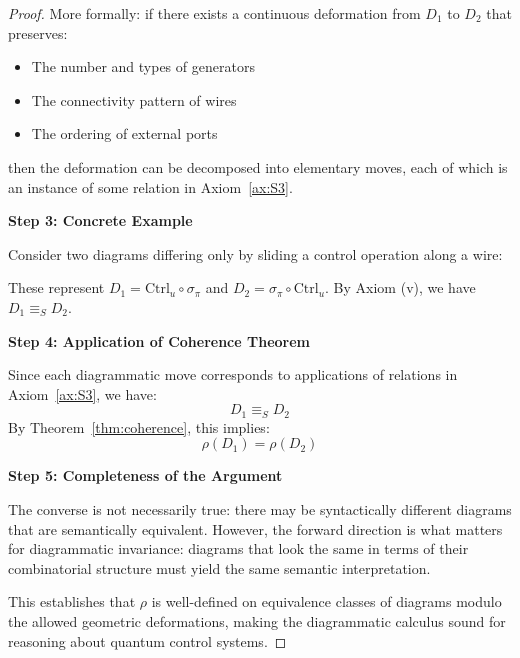 \documentclass[11pt]{article}
\begin{document}
\begin{proof}
More formally: if there exists a continuous deformation from $D_1$ to $D_2$ that preserves:
\begin{itemize}
    \item The number and types of generators
    \item The connectivity pattern of wires
    \item The ordering of external ports
\end{itemize}
then the deformation can be decomposed into elementary moves, each of which is an instance of some relation in Axiom~\ref{ax:S3}.

\noindent\textbf{Step 3: Concrete Example}

Consider two diagrams differing only by sliding a control operation along a wire:

\begin{center}
\end{center}

These represent $D_1 = \mathrm{Ctrl}_u \circ \sigma_\pi$ and $D_2 = \sigma_\pi \circ \mathrm{Ctrl}_u$. By Axiom (v), we have $D_1 \equiv_S D_2$.

\noindent\textbf{Step 4: Application of Coherence Theorem}

Since each diagrammatic move corresponds to applications of relations in Axiom~\ref{ax:S3}, we have:
\[
D_1 \equiv_S D_2
\]
By Theorem~\ref{thm:coherence}, this implies:
\[
\rho(D_1) = \rho(D_2)
\]

\noindent\textbf{Step 5: Completeness of the Argument}

The converse is not necessarily true: there may be syntactically different diagrams that are semantically equivalent. However, the forward direction is what matters for diagrammatic invariance: diagrams that look the same in terms of their combinatorial structure must yield the same semantic interpretation.

This establishes that $\rho$ is well-defined on equivalence classes of diagrams modulo the allowed geometric deformations, making the diagrammatic calculus sound for reasoning about quantum control systems.
\end{proof}
\end{document}
